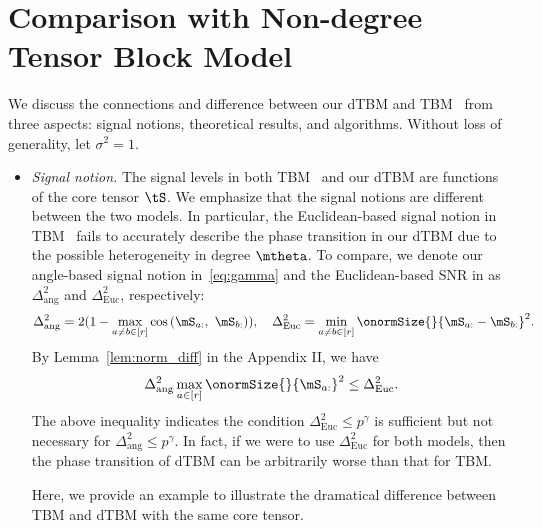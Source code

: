 \documentclass[lettersize,onecolumn,journal]{IEEEtran}
\theoremstyle{definition}
\theoremstyle{definition}
\newcommand{\of}[1]{\left(#1\right)}
\begin{document}
{
  

\section{Comparison with Non-degree Tensor Block Model} \label{sec:tbm}
We discuss the connections and difference between our dTBM and TBM~\citep{han2020exact} from three aspects: signal notions, theoretical results, and algorithms. Without loss of generality, let $\sigma^2=1$. 

\begin{itemize}[wide]
    \item \textit{Signal notion.} The signal levels in both TBM~\citep{han2020exact} and our dTBM are functions of the core tensor $\tS$. We emphasize that the signal notions are different between the two models. In particular, the Euclidean-based signal notion in TBM~\cite{han2020exact} fails to accurately describe the phase transition in our dTBM due to the possible heterogeneity in degree $\mtheta$. To compare, we denote our angle-based signal notion in~\eqref{eq:gamma} and the Euclidean-based SNR in \cite{han2020exact} as $\Delta_{\text{ang}}^2$ and $\Delta_{\text{Euc}}^2$, respectively:
\begin{equation}
     \Delta_{\text{ang}}^2 =  2(1 - \max_{a \neq b\in [r]}\cos \of{\mS_{a:},\  \mS_{b:}} ), \quad \Delta_{\text{Euc}}^2 = \min_{a \neq b \in [r]} \onormSize{}{\mS_{a:} - \mS_{b:}}^2.
\end{equation}
By Lemma~\ref{lem:norm_diff} in the Appendix II, we have 
\begin{equation}\label{eq:signalcompare}
     \Delta_{\text{ang}}^2  \max_{a \in [r]}\onormSize{}{\mS_{a:}}^2 \leq \Delta_{\text{Euc}}^2.
\end{equation}
The above inequality indicates the condition $\Delta_{\text{Euc}}^2 \leq p^{\gamma}$ is sufficient but not necessary for $\Delta_{\text{ang}}^2 \leq p^{\gamma}$. In fact, if we were to use $\Delta_{\text{Euc}}^2$ for both models, then the phase transition of dTBM can be arbitrarily worse than that for TBM. 


Here, we provide an example to illustrate the dramatical difference between TBM and dTBM with the same core tensor.  


\end{itemize}}
\end{document}
